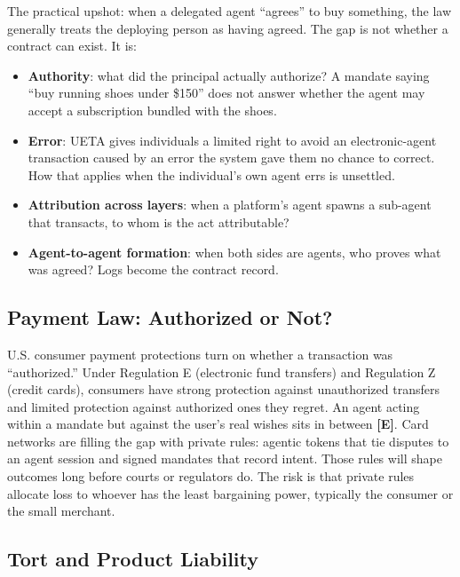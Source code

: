 \documentclass[11pt,letterpaper]{article}
\begin{document}
The practical upshot: when a delegated agent ``agrees'' to buy something, the law generally treats the deploying person as having agreed. The gap is not whether a contract can exist. It is:
\begin{itemize}
  \item \textbf{Authority}: what did the principal actually authorize? A mandate saying ``buy running shoes under \$150'' does not answer whether the agent may accept a subscription bundled with the shoes.
  \item \textbf{Error}: UETA gives individuals a limited right to avoid an electronic-agent transaction caused by an error the system gave them no chance to correct. How that applies when the individual's own agent errs is unsettled.
  \item \textbf{Attribution across layers}: when a platform's agent spawns a sub-agent that transacts, to whom is the act attributable?
  \item \textbf{Agent-to-agent formation}: when both sides are agents, who proves what was agreed? Logs become the contract record.
\end{itemize}

\subsection{Payment Law: Authorized or Not?}

U.S. consumer payment protections turn on whether a transaction was ``authorized.'' Under Regulation E (electronic fund transfers) and Regulation Z (credit cards), consumers have strong protection against unauthorized transfers and limited protection against authorized ones they regret. An agent acting within a mandate but against the user's real wishes sits in between \textbf{[E]}. Card networks are filling the gap with private rules: agentic tokens that tie disputes to an agent session and signed mandates that record intent. Those rules will shape outcomes long before courts or regulators do. The risk is that private rules allocate loss to whoever has the least bargaining power, typically the consumer or the small merchant.

\subsection{Tort and Product Liability}
\end{document}

